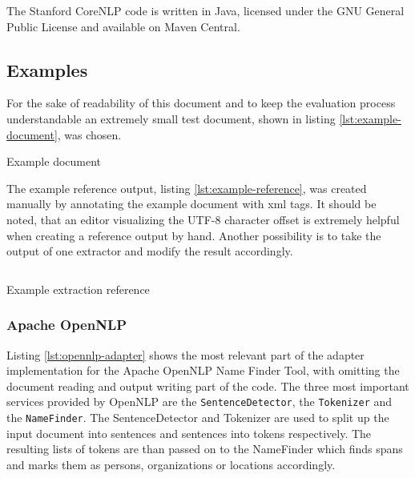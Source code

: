 The Stanford CoreNLP code is written in Java, licensed under the GNU General Public License and available on Maven Central.

\newpage
\subsection{Examples}
For the sake of readability of this document and to keep the evaluation process understandable an extremely small test document, shown in listing \ref{lst:example-document}, was chosen.

\begin{listing}[H]
\texttt{}
\caption{Example document}
\label{lst:example-document}
\end{listing}

The example reference output, listing \ref{lst:example-reference}, was created manually by annotating the example document with xml tags. It should be noted, that an editor visualizing the UTF-8 character offset is extremely helpful when creating a reference output by hand. Another possibility is to take the output of one extractor and modify the result accordingly.

\begin{listing}[H]
\inputminted{xml}{reference.xml}
\caption{Example extraction reference}
\label{lst:example-reference}
\end{listing}

\newpage
\subsubsection{Apache OpenNLP}
Listing \ref{lst:opennlp-adapter} shows the most relevant part of the adapter implementation for the Apache OpenNLP Name Finder Tool, with omitting the document reading and output writing part of the code. The three most important services provided by OpenNLP are the \texttt{SentenceDetector}, the \texttt{Tokenizer} and the \texttt{NameFinder}. The SentenceDetector and Tokenizer are used to split up the input document into sentences and sentences into tokens respectively. The resulting lists of tokens are than passed on to the NameFinder which finds spans and marks them as persons, organizations or locations accordingly.

